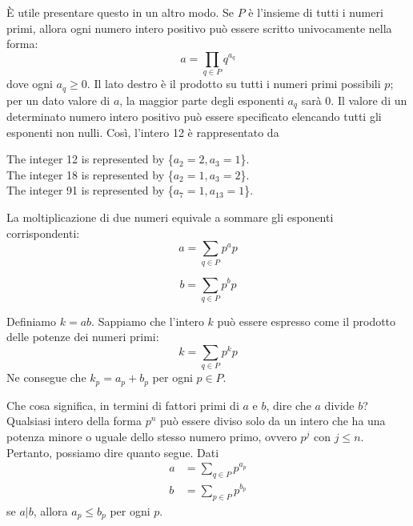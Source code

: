 \documentclass{article}
\theoremstyle{definition}
\begin{document}
È utile presentare questo in un altro modo. Se \( P \) è l'insieme di tutti i numeri primi, allora ogni numero intero positivo può essere scritto univocamente nella forma:
\[ a = \prod_{q \in P} q^{a_q} \]
dove ogni \( a_q \geq 0 \). Il lato destro è il prodotto su tutti i numeri primi possibili \( p \); per un dato valore di \( a \), la maggior parte degli esponenti \( a_q \) sarà 0. Il valore di un determinato numero intero positivo può essere specificato elencando tutti gli esponenti non nulli. Così, l'intero 12 è rappresentato da
\begin{center}
\begin{minipage}{0.8\textwidth} %
\begin{shaded}
\noindent
The integer 12 is represented by \{$a_2 = 2, a_3 = 1$\}. \\
The integer 18 is represented by \{$a_2 = 1, a_3 = 2$\}. \\
The integer 91 is represented by \{$a_7 = 1, a_{13} = 1$\}.
\end{shaded}
\end{minipage}
\end{center}

La moltiplicazione di due numeri equivale a sommare gli esponenti corrispondenti:
\begin{equation*}
a = \sum_{q \in P} p^a p
\end{equation*}

\begin{equation*}
b = \sum_{q \in P} p^b p
\end{equation*}

Definiamo \( k = ab \). Sappiamo che l'intero \( k \) può essere espresso come il prodotto delle potenze dei numeri primi: 
\begin{equation*}
k = \sum_{q \in P} p^k p
\end{equation*}
Ne consegue che \( k_p = a_p + b_p \) per ogni \( p \in P \).


Che cosa significa, in termini di fattori primi di \( a \) e \( b \), dire che \( a \) divide \( b \)? 
Qualsiasi intero della forma \( p^n \) può essere diviso solo da un intero che ha una potenza 
minore o uguale dello stesso numero primo, ovvero \( p^j \) con \( j \leq n \). Pertanto, possiamo dire quanto segue.
Dati
\begin{align*}
a &= \sum_{q \in P} p^{a_p} \\
b &= \sum_{p \in P} p^{b_p}
\end{align*}
se \( a | b \), allora \( a_p \leq b_p \) per ogni \( p \).
\end{document}
